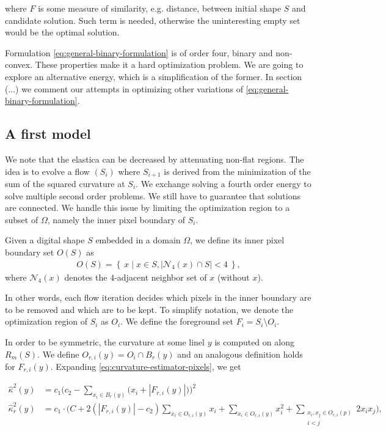 \documentclass[runningheads]{llncs}
\newcommand{\jaco}[1]{{\textcolor{green!50!black}{#1}}}
\begin{document}
where $F$ is some measure of similarity, e.g. distance, between initial shape $S$ and candidate solution. Such term is needed, otherwise the uninteresting empty set would be the optimal solution.

Formulation \eqref{eq:general-binary-formulation} is of order four, binary and non-convex. These properties make it a hard optimization problem. We are going to explore an alternative energy, which is a simplification of the \jaco{former}. In section (...) we comment our attempts in optimizing  other variations of \eqref{eq:general-binary-formulation}.

\subsection{A first model}

We note that the elastica can be decreased by attenuating non-flat regions. The idea is to evolve a flow $(S_i)$ where $S_{i+1}$ is derived from the minimization of the sum of the squared curvature at $S_i$. We exchange solving a fourth order energy to solve multiple second order problems. We still have to guarantee that solutions are connected. We handle this issue by limiting the optimization region to a subset of $\Omega$, namely the inner pixel boundary of  $S_i$.

\begin{definition}
{
Given a digital shape $S$ embedded in a domain $\Omega$, we define its inner pixel boundary set $O(S)$ as
\begin{align*}
	O(S) = \left\{ \: x \; | \; x \in S, |\mathcal{N}_4(x) \cap S|<4 \: \right\},
\end{align*}
where $\mathcal{N}_4(x)$ denotes the $4$-adjacent neighbor set of $x$ (without $x$).
}
\end{definition}

In other words, each flow iteration decides which pixels in the inner boundary are to be removed and which are to be kept. To simplify notation, we denote the optimization region of $S_i$ as $O_i$. We define the foreground set $F_i = S_i \setminus O_i$.

In order to be symmetric, the curvature at some linel $y$ is computed on along $R_m(S)$. We define $O_{r,i}(y) = O_i \cap B_r(y)$ and an analogous definition holds for $F_{r,i}(y)$. Expanding \eqref{eq:curvature-estimator-pixels}, we get 

	\begin{align*}
		\hat{\kappa}^2(y) &= c_1\Big( c_2 - \sum_{x_i \in B_r(y)} \big( {x_i} + |F_{r,i}(y)| \big) \Big)^2 \\
		\hat{\kappa}_{r}^2(y) &= c_1 \cdot \Big( C + 2\left( |F_{r,i}(y)| - c_2 \right) \sum_{x_i \in O_{r,i}(y)}{x_i} + \sum_{x_i \in O_{r,i}(y)}{x_i^2} + \sum_{ \substack{x_i,x_j \in O_{r,i}(p) \\ i<j} }{2x_ix_j}  \Big),
	\end{align*}
	
\end{document}
